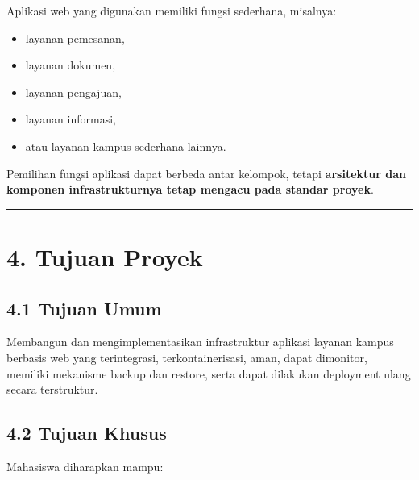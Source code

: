 \documentclass[
]{article}
\providecommand{\tightlist}{%
  \setlength{\itemsep}{0pt}\setlength{\parskip}{0pt}}
\begin{document}
Aplikasi web yang digunakan memiliki fungsi sederhana, misalnya:

\begin{itemize}
\tightlist
\item
  layanan pemesanan,
\item
  layanan dokumen,
\item
  layanan pengajuan,
\item
  layanan informasi,
\item
  atau layanan kampus sederhana lainnya.
\end{itemize}

Pemilihan fungsi aplikasi dapat berbeda antar kelompok, tetapi
\textbf{arsitektur dan komponen infrastrukturnya tetap mengacu pada
standar proyek}.

\begin{center}\rule{0.5\linewidth}{0.5pt}\end{center}

\section{4. Tujuan Proyek}\label{tujuan-proyek}

\subsection{4.1 Tujuan Umum}\label{tujuan-umum}

Membangun dan mengimplementasikan infrastruktur aplikasi layanan kampus
berbasis web yang terintegrasi, terkontainerisasi, aman, dapat
dimonitor, memiliki mekanisme backup dan restore, serta dapat dilakukan
deployment ulang secara terstruktur.

\subsection{4.2 Tujuan Khusus}\label{tujuan-khusus}

Mahasiswa diharapkan mampu:
\end{document}
